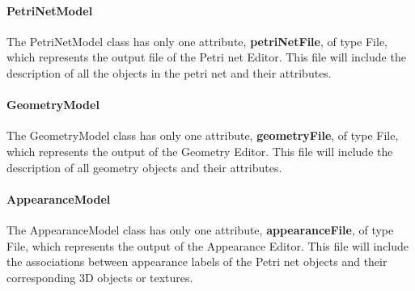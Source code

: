 \paragraph{PetriNetModel}

The PetriNetModel class has only one attribute, \textbf{petriNetFile}, of type File, which represents the output file of the Petri net Editor. This file will include the description of all the objects in the petri net and their attributes. 

\paragraph{GeometryModel}

The GeometryModel class has only one attribute, \textbf{geometryFile}, of type File, which represents the output of the Geometry Editor. This file will include the description of all geometry objects and their attributes.

\paragraph{AppearanceModel}

The AppearanceModel class has only one attribute, \textbf{appearanceFile}, of type File, which represents the output of the Appearance Editor. This file will include the associations between appearance labels of the Petri net objects and their corresponding 3D objects or textures. 

